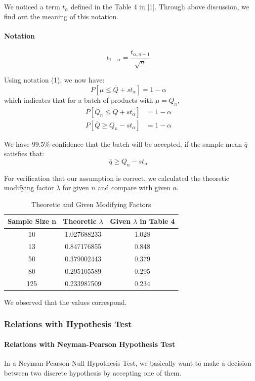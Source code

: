 \documentclass[a4paper]{article}
\begin{document}
We noticed a term $t_{\alpha}$ defined in the Table 4 in [1]. Through above discussion, we find out the meaning of this notation.

\paragraph{Notation}
\begin{equation}
t_{1-\alpha} = \frac{t_{\alpha,n-1}}{\sqrt{n}}
\end{equation}

Using notation (1), we now have:
$$P[\mu \leq \overline{Q}+ st_{\alpha}] = 1-\alpha$$
which indicates that for a batch of products with $\mu = Q_n$, 
\begin{align*}
P[Q_n \leq \overline{Q}+ st_{\alpha}] &= 1-\alpha\\
P[\overline{Q} \geq Q_n - st_{\alpha}] &= 1-\alpha
\end{align*}

We have $99.5\%$ confidence that the batch will be accepted, if the sample mean $\overline{q}$ satisfies that:
$$\overline{q} \geq Q_n - st_{\alpha}$$
 
For verification that our assumption is correct, we calculated the theoretic modifying factor $\lambda$ for given $n$ and compare with given $n$.

\begin{table}[!htbp]
  \centering
    \begin{tabular}{ccc}
    \hline
    Sample Size n & Theoretic $\lambda$ & Given $\lambda$ in Table 4 \\
    \hline
    10    & 1.027688233 & 1.028 \\
    13    & 0.847176855 & 0.848 \\
    50    & 0.379002443 & 0.379 \\
    80    & 0.295105589 & 0.295 \\
    125   & 0.233987509 & 0.234 \\
    \hline
    \end{tabular}%
   \caption{Theoretic and Given Modifying Factors}
\end{table}

We observed that the values correspond. 
\subsubsection{Relations with Hypothesis Test}
\paragraph{Relations with Neyman-Pearson Hypothesis Test}
In a Neyman-Pearson Null Hypothesis Test, we basically want to make a decision between two discrete hypothesis by accepting one of them.
\end{document}
